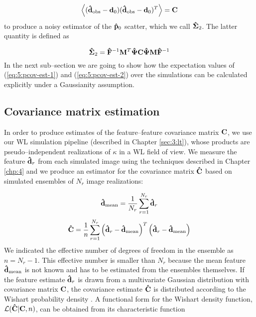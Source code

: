 \begin{equation}
\label{eq:5:expobs}
\left\langle(\mathbf{\hat{d}}_{\rm obs}-\mathbf{d}_0)(\mathbf{\hat{d}}_{\rm obs}-\mathbf{d}_0)^T\right\rangle = \mathbf{C}
\end{equation}
%
to produce a noisy estimator of the $\mathbf{\hat{p}}_0$ scatter, which we call $\mathbf{\hat{\Sigma}}_2$. The latter quantity is defined as 

\begin{equation}
\label{eq:5:pcov-est-2}
\mathbf{\hat{\Sigma}}_2 = \mathbf{\hat{F}}^{-1}\mathbf{M}^T\mathbf{\hat{\Psi}}\mathbf{C}\mathbf{\hat{\Psi}}\mathbf{M}\mathbf{\hat{F}}^{-1} 
\end{equation} 
%
In the next sub--section we are going to show how the expectation values of (\ref{eq:5:pcov-est-1}) and (\ref{eq:5:pcov-est-2}) over the simulations can be calculated explicitly under a Gaussianity assumption.    

\subsection{Covariance matrix estimation}
In order to produce estimates of the feature--feature covariance matrix $\mathbf{C}$, we use our WL simulation pipeline (described in Chapter \ref{sec:3:lt}), whose products are pseudo--independent realizations of $\kappa$ in a WL field of view. We measure the feature $\mathbf{\hat{d}}_r$ from each simulated image using the techniques described in Chapter \ref{chp:4} and we produce an estimator for the covariance matrix $\mathbf{\hat{C}}$ based on simulated ensembles of $N_r$ image realizations:

\begin{equation}
\label{eq:5:meanest-sim}
\mathbf{\hat{d}}_{\rm mean} = \frac{1}{N_r}\sum_{r=1}^{N_r}\mathbf{\hat{d}}_r 
\end{equation}
%
\begin{equation}
\label{eq:5:covestest-sim}
\mathbf{\hat{C}} = \frac{1}{n}\sum_{r=1}^{N_r}\left(\mathbf{\hat{d}}_r-\mathbf{\hat{d}}_{\rm mean}\right)^T\left(\mathbf{\hat{d}}_r-\mathbf{\hat{d}}_{\rm mean}\right) 
\end{equation}
%
We indicated the effective number of degrees of freedom in the ensemble as $n=N_r-1$. This effective number is smaller than $N_r$ because the mean feature $\mathbf{\hat{d}}_{\rm mean}$ is not known and has to be estimated from the ensembles themselves. If the feature estimate $\mathbf{\hat{d}}_r$ is drawn from a multivariate Gaussian distribution with covariance matrix $\mathbf{C}$, the covariance estimate $\mathbf{\hat{C}}$ is distributed according to the Wishart probability density \citep{Taylor12,Taylor14,MasumotoWishart}. A functional form for the Wishart density function, $\mathcal{L}(\mathbf{\hat{C}}\vert\mathbf{C},n)$, can be obtained from its characteristic function 

